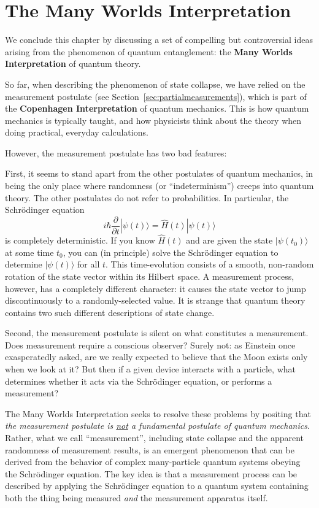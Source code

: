 \documentclass[pra,12pt]{revtex4}
\begin{document}
\section{The Many Worlds Interpretation}

We conclude this chapter by discussing a set of compelling but
controversial ideas arising from the phenomenon of quantum
entanglement: the \textbf{Many Worlds Interpretation} of quantum
theory.

So far, when describing the phenomenon of state collapse, we have
relied on the measurement postulate (see
Section~\ref{sec:partialmeasurements}), which is part of the
\textbf{Copenhagen Interpretation} of quantum mechanics.  This is how
quantum mechanics is typically taught, and how physicists think about
the theory when doing practical, everyday calculations.

However, the measurement postulate has two bad features:

First, it seems to stand apart from the other postulates of quantum
mechanics, in being the only place where randomness (or
``indeterminism'') creeps into quantum theory.  The other postulates
do not refer to probabilities.  In particular, the Schr\"odinger equation
\begin{equation}
  i\hbar\frac{\partial}{\partial t}|\psi(t)\rangle = \hat{H}(t) |\psi(t)\rangle
\end{equation}
is completely deterministic.  If you know $\hat{H}(t)$ and are given
the state $|\psi(t_0)\rangle$ at some time $t_0$, you can (in
principle) solve the Schr\"odinger equation to determine
$|\psi(t)\rangle$ for all $t$.  This time-evolution consists of a
smooth, non-random rotation of the state vector within its Hilbert
space.  A measurement process, however, has a completely different
character: it causes the state vector to jump discontinuously to a
randomly-selected value.  It is strange that quantum theory contains
two such different descriptions of state change.

Second, the measurement postulate is silent on what constitutes a
measurement.  Does measurement require a conscious observer?  Surely
not: as Einstein once exasperatedly asked, are we really expected to
believe that the Moon exists only when we look at it?  But then if a
given device interacts with a particle, what determines whether it
acts via the Schr\"odinger equation, or performs a measurement?

The Many Worlds Interpretation seeks to resolve these problems by
positing that \textit{the measurement postulate is \underline{not} a
  fundamental postulate of quantum mechanics}.  Rather, what we call
``measurement'', including state collapse and the apparent randomness
of measurement results, is an emergent phenomenon that can be derived
from the behavior of complex many-particle quantum systems obeying the
Schr\"odinger equation.  The key idea is that a measurement process
can be described by applying the Schr\"odinger equation to a quantum
system containing both the thing being measured \textit{and} the
measurement apparatus itself.
\end{document}
